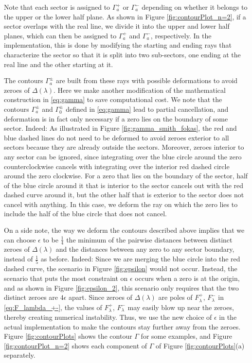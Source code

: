 \documentclass[11pt, oneside, a4paper]{article}
\begin{document}
Note that each sector is assigned to $\Gamma_a^+$ or $\Gamma_a^-$ depending on whether it belongs to the upper or the lower half plane. As shown in Figure \ref{fig:contourPlot_n=2}, if a sector overlaps with the real line, we divide it into the upper and lower half planes, which can then be assigned to $\Gamma_a^+$ and $\Gamma_a^-$, respectively. In the implementation, this is done by modifying the starting and ending rays that characterize the sector so that it is split into two sub-sectors, one ending at the real line and the other starting at it.

The contours $\Gamma_a^\pm$ are built from these rays with possible deformations to avoid zeroes of $\Delta(\lambda)$. Here we make another modification of the mathematical construction in \eqref{eq:gamma} to save computational cost. We note that the contours $\Gamma_a^\pm$ and $\Gamma_0^\pm$ defined in \eqref{eq:gamma} lead to partial cancellation, and deformation is in fact only necessary if a zero lies on the boundary of some sector. Indeed: As illustrated in Figure \ref{fig:gamma_smith_fokas}, the red and blue dashed lines do not need to be deformed to avoid zeroes exterior to all sectors because they are already outside the sectors. Moreover, zeroes interior to any sector can be ignored, since integrating over the blue circle around the zero counterclockwise cancels with integrating over the interior red dashed circle around the zero clockwise. For a zero that lies on the boundary of the sector, half of the blue circle around it that is interior to the sector cancels out with the red dashed curve around it, but the other half that is exterior to the sector does not cancel with anything. In this case, we deform the ray on which the zero lies to include the half of the blue circle that does not cancel. 

On a side note, the way we deform the contours described above implies that we can choose $\epsilon$ to be $\frac{1}{4}$ the minimum of the pairwise distances between distinct zeroes of $\Delta(\lambda)$ and the distances between any zero to any sector boundary, instead of $\frac{1}{5}$ as before. Indeed: Since we are merging the blue circle into the red dashed curve, the scenario in Figure \ref{fig:epsilon} would not occur. Instead, the scenario that puts the most constraint on $\epsilon$ occurs when a zero is at the origin, and as shown in Figure \ref{fig:epsilon_2}, this scenario only requires that the two distinct zeroes are $4\epsilon$ apart. Since zeroes of $\Delta(\lambda)$ are poles of $F_\lambda^+$, $F_\lambda^-$ in \eqref{eq:F_lambda_+-}, the values of $F_\lambda^+$, $F_\lambda^-$ may easily blow up near the zeroes, thereby creating numerical instability. Thus, we use the new choice of $\epsilon$ in the actual implementation to make the contours stay further away from the zeroes. Figure \ref{fig:contourPlots} shows the contour $\Gamma$ for some examples, and Figure \ref{fig:contourPlot_n=2} shows each component of $\Gamma$ of Figure \ref{fig:contourPlots}(a) separately.
\end{document}

